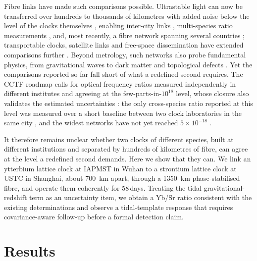 \documentclass[11pt,a4paper]{article}
\newcommand{\e}[1]{\times 10^{#1}}
\begin{document}
Fibre links have made such comparisons possible. Ultrastable light can
now be transferred over hundreds to thousands of kilometres with added
noise below the level of the clocks themselves
\citep{schioppo2022cavities, chen2026dissemination}, enabling inter-city
links \citep{lisdat2016network}, multi-species ratio measurements
\citep{beloy2021bacon}, and, most recently, a fibre network spanning
several countries \citep{pizzocaro2026european}; transportable clocks,
satellite links and free-space dissemination have extended comparisons
further \citep{laurent2015aces, lindvall2025coordinated,
shen2022freespace}. Beyond metrology, such
networks also probe fundamental physics, from gravitational waves
\citep{kolkowitz2016gw} to dark matter and topological defects
\citep{derevianko2014topological}. Yet the comparisons
reported so far fall short of what a redefined second requires. The
CCTF roadmap calls for optical frequency ratios measured independently
in different institutes and agreeing at the few-parts-in-$10^{18}$ level,
whose closure also validates the estimated uncertainties
\citep{dimarcq2024roadmap, riehle2015redefinition}: the only
cross-species ratio reported at this level was measured over a short
baseline between two clock laboratories in the same city
\citep{aeppli2026nist}, and the widest networks have not yet reached
$5\e{-18}$ \citep{lindvall2025coordinated}.

It therefore remains unclear whether two clocks of different species,
built at different institutions and separated by hundreds of kilometres
of fibre, can agree at the level a redefined second demands. Here we
show that they can. We link an ytterbium lattice clock at IAPMST in
Wuhan to a strontium lattice clock at USTC in Shanghai, about
\qty{700}{km} apart, through a \qty{1350}{km} phase-stabilised fibre, and
operate them coherently for $58$\,days. Treating the tidal
gravitational-redshift term as an uncertainty item, we obtain a Yb/Sr
ratio consistent with the existing determinations and observe a
tidal-template response that requires covariance-aware follow-up before a
formal detection claim.



\section{Results}
\end{document}
